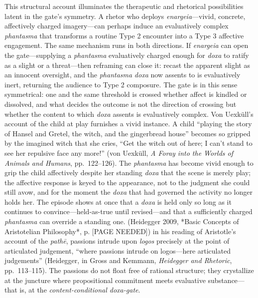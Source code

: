 \documentclass{article}
\begin{document}
This structural account illuminates the therapeutic and rhetorical possibilities latent in the gate's symmetry. A rhetor who deploys \textit{enargeia}---vivid, concrete, affectively charged imagery---can perhaps induce an evaluatively complex \textit{phantasma} that transforms a routine Type 2 encounter into a Type 3 affective engagement. The same mechanism runs in both directions. If \textit{enargeia} can open the gate---supplying a \textit{phantasma} evaluatively charged enough for \textit{doxa} to ratify as a slight or a threat---then reframing can close it: recast the apparent slight as an innocent oversight, and the \textit{phantasma} \textit{doxa} now assents to is evaluatively inert, returning the audience to Type 2 composure. The gate is in this sense symmetrical: one and the same threshold is crossed whether affect is kindled or dissolved, and what decides the outcome is not the direction of crossing but whether the content to which \textit{doxa} assents is evaluatively complex. Von Uexküll's account of the child at play furnishes a vivid instance. A child ``playing the story of Hansel and Gretel, the witch, and the gingerbread house'' becomes so gripped by the imagined witch that she cries, ``Get the witch out of here; I can't stand to see her repulsive face any more!'' (von Uexküll, \textit{A Foray into the Worlds of Animals and Humans}, pp.~122--126). The \textit{phantasma} has become vivid enough to grip the child affectively despite her standing \textit{doxa} that the scene is merely play; the affective response is keyed to the appearance, not to the judgment she could still avow, and for the moment the \textit{doxa} that had governed the activity no longer holds her. The episode shows at once that a \textit{doxa} is held only so long as it continues to convince---held-as-true until revised---and that a sufficiently charged \textit{phantasma} can override a standing one. (Heidegger 2009, *Basic Concepts of Aristotelian Philosophy*, p. [PAGE NEEDED]) in his reading of Aristotle's account of the \textit{pathē}, passions intrude upon \textit{logos} precisely at the point of articulated judgement, ``where passions intrude on logos---here articulated judgements'' (Heidegger, in Gross and Kemmann, \textit{Heidegger and Rhetoric}, pp.~113--115). The passions do not float free of rational structure; they crystallize at the juncture where propositional commitment meets evaluative substance---that is, at the \textit{content-conditional doxa-gate}.
\end{document}
